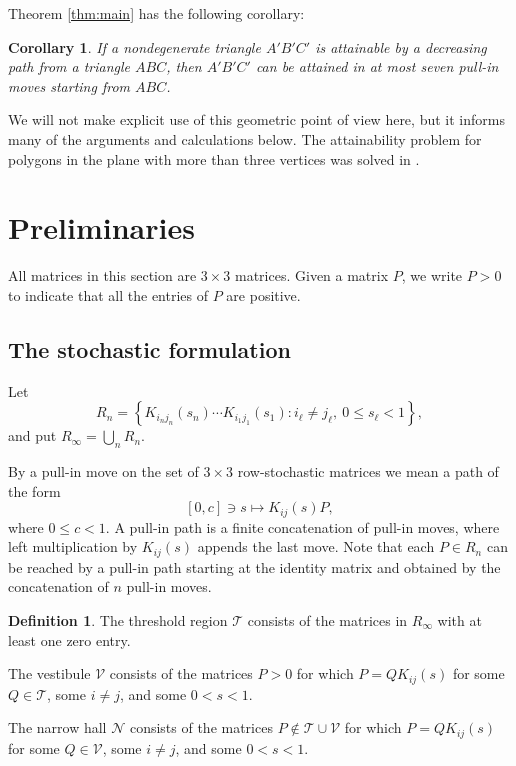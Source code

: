 \documentclass[11pt,onecolumn]{amsart}
\theoremstyle{plain}
\newtheorem{corollary}[theorem]{Corollary}
\theoremstyle{definition}
\newtheorem{definition}[theorem]{Definition}
\theoremstyle{remark}
\newcommand{\T}{\mathcal T}
\newcommand{\V}{\mathcal V}
\newcommand{\NH}{\mathcal N}
\begin{document}
Theorem \ref{thm:main} has the following corollary:

\begin{corollary}
If a nondegenerate triangle $A'B'C'$ is attainable by a decreasing path from a triangle $ABC$,  then $A'B'C'$ can be attained
in at most seven pull-in moves starting from $ABC$.	
\end{corollary}	


We will not make explicit use of this geometric point of view
here, but it informs many of the arguments and calculations below. The attainability problem for polygons in the plane with more than three vertices
was solved in \cite{DecreasingPaths}.



 


 
	
\section{Preliminaries}
\label{sec:preliminaries}

All matrices in this section are $3\times3$ matrices. Given a matrix $P$, we 
write $P>0$ to indicate that all the entries of $P$
are positive.


\subsection{The stochastic formulation}
Let
\[
R_n=\left\{
K_{i_nj_n}(s_n)\cdots K_{i_1j_1}(s_1):
 i_\ell\neq j_\ell,\ 0\leq s_\ell<1
\right\},
\]
and put $R_\infty=\bigcup_nR_n$.

By a pull-in move on the set of $3\times 3$ row-stochastic matrices we mean a path of the form
\[
[0,c]\ni s\mapsto K_{ij}(s)P,
\]
where $0\leq c<1$. A pull-in path  is  a finite concatenation of pull-in moves, where left multiplication by $K_{ij}(s)$
appends the last move. Note that each  $P\in R_n$ can be reached by  a pull-in path starting at the identity matrix and
obtained by the concatenation of $n$ pull-in moves.


\begin{definition}
The threshold region $\T$ consists of the matrices in $R_\infty$ with at least one
zero entry.  

The vestibule $\V$ consists of the matrices $P>0$
for which $P=QK_{ij}(s)$ for some $Q\in\T$, some $i\neq j$, and some $0 < s <1$. 

The narrow
hall $\NH$ consists of the matrices $P\notin\T\cup\V$ for which
$P=QK_{ij}(s)$ for some $Q\in\V$, some $i\neq j$, and some $0<s<1$.
\end{definition}
\end{document}

